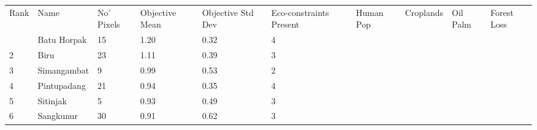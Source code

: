 \begin{table}[ht]
\centering
\begingroup\fontsize{9pt}{10pt}\selectfont
\begin{tabular}{C{0.05\textwidth}C{0.15\textwidth}C{0.08\textwidth}C{0.08\textwidth}C{0.08\textwidth}C{0.08\textwidth}C{0.08\textwidth}C{0.08\textwidth}C{0.08\textwidth}C{0.08\textwidth}}
 Rank & Name & No' Pixels & Objective Mean & Objective Std Dev & Eco-constraints  Present & Human Pop & Croplands & Oil Palm & Forest Loss \\ 
  & Batu Horpak &  15 & \textcolor[HTML]{FFFFFF}{1.20} & \textcolor[HTML]{000000}{0.32} & \textcolor[HTML]{FFFFFF}{4} &  &  &  &  \\ 
  {2} & Biru &  23 & \textcolor[HTML]{FFFFFF}{1.11} & \textcolor[HTML]{000000}{0.39} & \textcolor[HTML]{000000}{3} &  &  &  &  \\ 
  {3} & Simangambat &   9 & \textcolor[HTML]{FFFFFF}{0.99} & \textcolor[HTML]{FFFFFF}{0.53} & \textcolor[HTML]{000000}{2} &  &  &  &  \\ 
  {4} & Pintupadang &  21 & \textcolor[HTML]{000000}{0.94} & \textcolor[HTML]{000000}{0.35} & \textcolor[HTML]{FFFFFF}{4} &  &  &  &  \\ 
  {5} & Sitinjak &   5 & \textcolor[HTML]{000000}{0.93} & \textcolor[HTML]{FFFFFF}{0.49} & \textcolor[HTML]{000000}{3} &  &  &  &  \\ 
  {6} & Sangkunur &  30 & \textcolor[HTML]{000000}{0.91} & \textcolor[HTML]{FFFFFF}{0.62} & \textcolor[HTML]{000000}{3} &  &  &  &  \\ 

\end{tabular}
\end{table}
